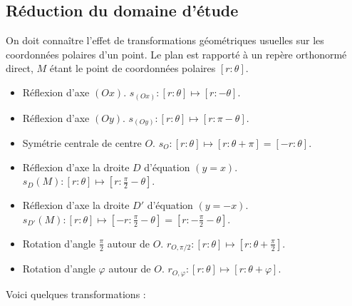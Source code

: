 \documentclass[class=report,crop=false]{standalone}
\begin{document}
\subsection{Réduction du domaine d'étude}


On doit connaître l'effet de transformations géométriques
usuelles sur les coordonnées polaires d'un point.
Le plan est rapporté à un repère orthonormé direct,
$M$ étant le point de coordonnées polaires $[r:\theta]$.

\begin{itemize}
  \item Réflexion d'axe $(Ox)$. $s_{(Ox)} : [r:\theta] \mapsto [r:-\theta]$.

  \item Réflexion d'axe $(Oy)$. $s_{(Oy)} : [r:\theta] \mapsto [r:\pi-\theta]$.

  \item Symétrie centrale de centre $O$. $s_O : [r:\theta] \mapsto [r:\theta+\pi]=[-r:\theta]$.

  \item Réflexion d'axe la droite $D$ d'équation $(y=x)$.
$s_D(M) : [r:\theta] \mapsto [r:\frac{\pi}{2}-\theta]$.

  \item Réflexion d'axe la droite $D'$ d'équation $(y=-x)$.
$s_{D'}(M) : [r:\theta] \mapsto [-r:\frac{\pi}{2}-\theta]=[r:-\frac{\pi}{2}-\theta]$.

  \item Rotation d'angle $\frac{\pi}{2}$ autour de $O$.
$r_{O,\pi/2} : [r:\theta] \mapsto [r:\theta+\frac{\pi}{2}]$.

  \item Rotation d'angle $\varphi$ autour de $O$.
  $r_{O,\varphi} : [r:\theta] \mapsto [r:\theta+\varphi]$.
\end{itemize}

Voici quelques transformations :
\end{document}
